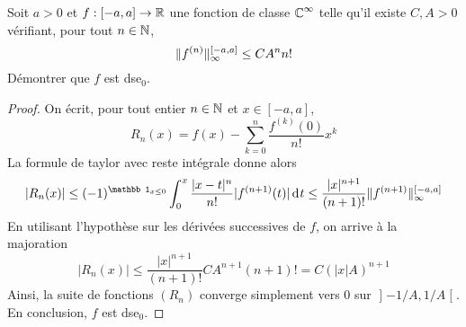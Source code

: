 \documentclass[10pt]{scrartcl}
\begin{document}
    \begin{exo}
        Soit $a>0$ et $f:[-a,a]\to\operatorname{\mathbb R}$ une fonction de classe $\operatorname{\mathbb C}^\infty$ telle qu'il existe $C,A>0$ vérifiant, pour tout $n\in\operatorname{\mathbb N}$,
        \[
            \lVert f^{(n)}\rVert_\infty^{[-a,a]}\leq CA^nn!
        \]
        Démontrer que $f$ est dse${}_0$.
    \end{exo}

    \begin{proof}
        On écrit, pour tout entier $n\in\operatorname{\mathbb N}$ et $x\in[-a,a]$, 
        \[
            R_n(x)=f(x)-\sum_{k=0}^n\frac{f^{(k)}(0)}{n!}x^k
        \]
        La formule de taylor avec reste intégrale donne alors
        \[
            |R_n(x)|\leq(-1)^{\mathbb1_{x\leq 0}}\int_0^x\frac{|x-t|^n}{n!}|f^{(n+1)}(t)|\dd t\leq \frac{|x|^{n+1}}{(n+1)!}\norm{f^{(n+1)}}_\infty^{[-a,a]}
        \]
        En utilisant l'hypothèse sur les dérivées successives de $f$, on arrive à la majoration 
        \[
            |R_n(x)|\leq\frac{|x|^{n+1}}{(n+1)!}CA^{n+1}(n+1)!=C(|x|A)^{n+1}
        \]
        Ainsi, la suite de fonctions $(R_n)$ converge simplement vers $0$ sur $\mathopen]-1/A,1/A\mathclose[$.
        En conclusion, $f$ est dse${}_0$.
    \end{proof}
\end{document}
